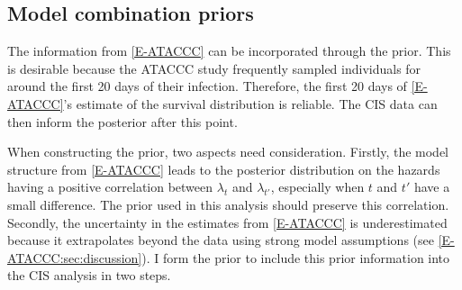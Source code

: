 \documentclass[thesis.tex]{subfiles}
\begin{document}
\subsection{Model combination priors} \label{perf-test:sec:informative-priors}

The information from \cref{E-ATACCC} can be incorporated through the prior.
This is desirable because the ATACCC study frequently sampled individuals for around the first 20 days of their infection.
Therefore, the first 20 days of \cref{E-ATACCC}'s estimate of the survival distribution is reliable.
The CIS data can then inform the posterior after this point.

When constructing the prior, two aspects need consideration.
Firstly, the model structure from \cref{E-ATACCC} leads to the posterior distribution on the hazards having a positive correlation between $\lambda_t$ and $\lambda_{t'}$, especially when $t$ and $t'$ have a small difference.
The prior used in this analysis should preserve this correlation.
Secondly, the uncertainty in the estimates from \cref{E-ATACCC} is underestimated because it extrapolates beyond the data using strong model assumptions (see \cref{E-ATACCC:sec:discussion}).
I form the prior to include this prior information into the CIS analysis in two steps.
\end{document}
